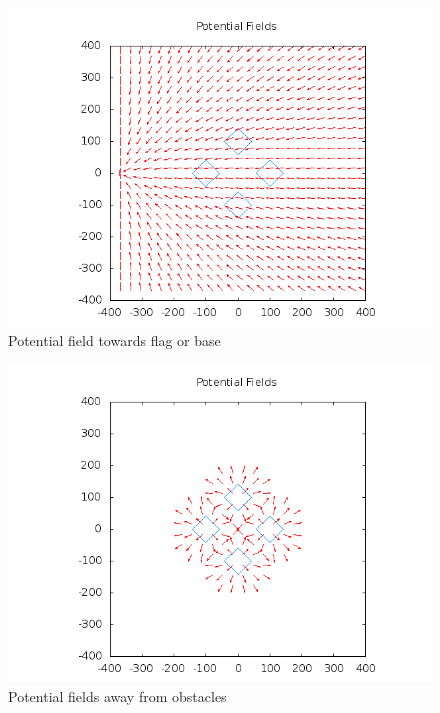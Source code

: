 \documentclass[11pt]{article}
\begin{document}
\begin{figure}[h]
	\caption{Potential field towards flag or base}
	\includegraphics[scale=.2]{plots/rotated_box_world/pfFlag.png}
\end{figure}
\begin{figure}[h]
	\caption{Potential fields away from obstacles}
	\includegraphics[scale=.2]{plots/rotated_box_world/pfObstacles.png}
\end{figure}
\end{document}
